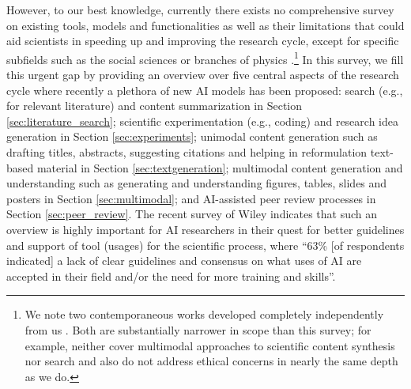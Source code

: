 However, to our best knowledge, currently there exists no comprehensive survey on existing tools, models and functionalities as well as their limitations that could aid scientists in speeding up and improving the research cycle, except for specific subfields such as the social sciences \cite{XU2024103665} or branches of physics \cite{Zhang2023ArtificialIF}.\footnote{We note two contemporaneous works developed completely independently from us \cite{zhang-etal-2024-comprehensive-survey,luo2025llm4srsurveylargelanguage}. Both are substantially narrower in scope than this survey; for example, \citet{luo2025llm4srsurveylargelanguage} neither cover multimodal approaches to scientific content synthesis nor  search and also do not address ethical concerns in nearly the same depth as we do.} 
In this survey, we fill this urgent gap by providing an overview over five  central aspects of the research cycle where recently a plethora of new AI models has been proposed: search  (e.g., for relevant literature) and content summarization in Section \ref{sec:literature_search}; scientific experimentation (e.g., coding) and research idea generation in Section \ref{sec:experiments}; unimodal content generation such as drafting titles, abstracts, suggesting citations and helping in reformulation text-based material in Section \ref{sec:textgeneration}; multimodal content generation and understanding such as generating and understanding figures, tables, slides and posters in Section \ref{sec:multimodal}; and AI-assisted peer review processes in Section \ref{sec:peer_review}. The recent survey of Wiley indicates that such an overview is highly important for AI researchers in their quest for better guidelines and support of tool (usages) for the scientific process, where ``63\% [of respondents indicated] a lack of clear
guidelines and consensus on what uses of AI are accepted in their field and/or the need for more training and skills”.

